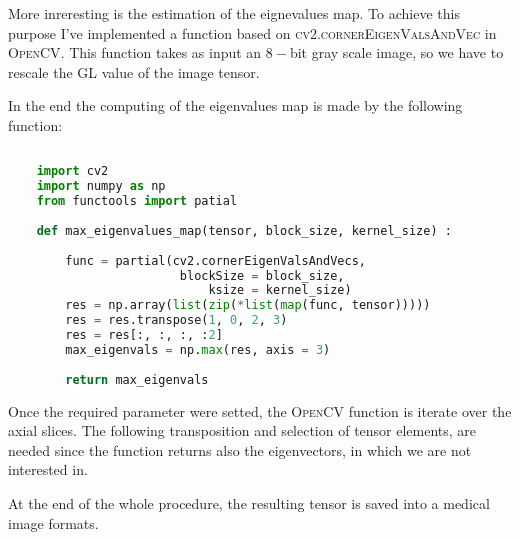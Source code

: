 \documentclass{standalone}
\begin{document}
	More inreresting is the estimation of the eignevalues map. To achieve this purpose I've implemented a function based on \textsc{cv2.cornerEigenValsAndVec} in \textsc{OpenCV}. This function takes as input an $8-$bit gray scale image, so we have to rescale the GL value of the image tensor. 
	
	In the end the computing of the eigenvalues map is made by the following function: 
		\lstset{style=python}
	\begin{lstlisting}[language=python, caption=HU registration function, label=code:saf]
		
	import cv2
	import numpy as np
	from functools import patial
		
	def max_eigenvalues_map(tensor, block_size, kernel_size) :
		
		func = partial(cv2.cornerEigenValsAndVecs, 
						blockSize = block_size, 
							ksize = kernel_size)
		res = np.array(list(zip(*list(map(func, tensor)))))
		res = res.transpose(1, 0, 2, 3)
		res = res[:, :, :, :2]
		max_eigenvals = np.max(res, axis = 3)
	
		return max_eigenvals

	\end{lstlisting}

	Once the required parameter were setted, the \textsc{OpenCV} function is iterate over the axial slices. The following transposition and selection of tensor elements, are needed since the function returns also the eigenvectors, in which we are not interested in. 
	
	At the end of the whole procedure, the resulting tensor is saved into a medical image formats. 
	
	
\end{document}
